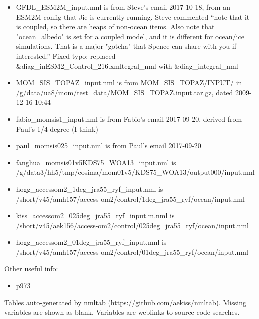 \documentclass[10pt]{article}
\newcommand{\nmllink}[2]{#1} %
\newcommand{\nml}[1]{{\footnotesize\textsf{}}}
\begin{document}
\begin{itemize}
\item GFDL_ESM2M_input.nml is from Steve's email 2017-10-18, from an ESM2M config that Jie is currently running. Steve commented ``note that it is coupled, so there are heaps of non-ocean items.  Also note that "ocean_albedo" is set for a coupled model, and it is different for ocean/ice simulations.  That is a major "gotcha" that Spence can share with you if interested.'' Fixed typo: replaced 
\&diag_inESM2_Control_216.xmltegral_nml
with
 \&diag_integral_nml
\item MOM_SIS_TOPAZ_input.nml is from MOM_SIS_TOPAZ/INPUT/ in\\ /g/data/ua8/mom/test_data/MOM_SIS_TOPAZ.input.tar.gz, dated 2009-12-16 10:44
\item fabio_momsis1_input.nml is from Fabio's email 2017-09-20, derived from Paul's 1/4 degree (I think)
\item paul_momsis025_input.nml is from Paul's email 2017-09-20
\item fanghua_momsis01v5KDS75_WOA13_input.nml is \\ /g/data3/hh5/tmp/cosima/mom01v5/KDS75_WOA13/output000/input.nml
\item hogg_accessom2_1deg_jra55_ryf_input.nml is \\ /short/v45/amh157/access-om2/control/1deg_jra55_ryf/ocean/input.nml
\item kiss_accessom2_025deg_jra55_ryf_input.m.nml is \\ /short/v45/aek156/access-om2/control/025deg_jra55_ryf/ocean/input.nml
\item hogg_accessom2_01deg_jra55_ryf_input.nml is \\ /short/v45/amh157/access-om2/control/01deg_jra55_ryf/ocean/input.nml
\end{itemize}

Other useful info:
\begin{itemize}
\item \citet{GriffiesWintonAndersonBensonDelworthDufourDunneGoddardMorrison2015a} p973
\end{itemize}

\renewcommand{\nmllink}[2]{\href{https://github.com/mom-ocean/MOM5/search?q=#2}{#1}} %
Tables auto-generated by nmltab (\url{https://github.com/aekiss/nmltab}).
Missing variables are shown as blank. Variables are \textcolor{link}{weblinks} to source code searches.
\end{document}
